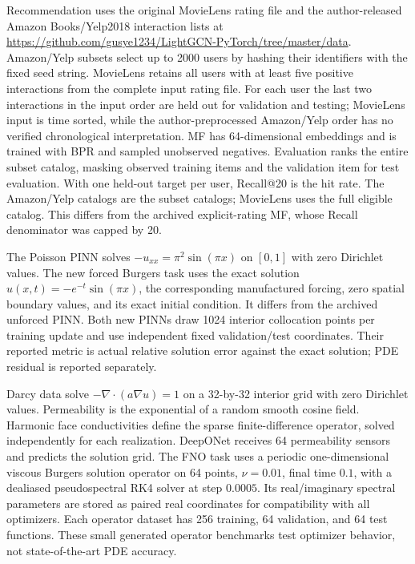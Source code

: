 Recommendation uses the original MovieLens rating file and the author-released
Amazon Books/Yelp2018 interaction lists at
\url{https://github.com/gusye1234/LightGCN-PyTorch/tree/master/data}.
Amazon/Yelp subsets select up to 2000 users by hashing their identifiers
with the fixed seed string. MovieLens retains all users with at least five
positive interactions from the complete input rating file. For each
user the last two interactions in the input order are held out for validation
and testing; MovieLens input is time sorted, while the author-preprocessed
Amazon/Yelp order has no verified chronological interpretation. MF has 64-dimensional
embeddings and is trained with BPR and sampled unobserved negatives. Evaluation
ranks the entire subset catalog, masking observed training items and the
validation item for test evaluation. With one held-out target per user,
Recall@20 is the hit rate. The Amazon/Yelp catalogs are the subset catalogs;
MovieLens uses the full eligible catalog. This differs from the archived
explicit-rating MF, whose Recall denominator was capped by 20.

The Poisson PINN solves $-u_{xx}=\pi^2\sin(\pi x)$ on $[0,1]$ with zero
Dirichlet values. The new forced Burgers task uses the exact solution
$u(x,t)=-e^{-t}\sin(\pi x)$, the corresponding manufactured forcing, zero
spatial boundary values, and its exact initial condition. It differs from the
archived unforced PINN. Both new PINNs draw 1024 interior collocation points
per training update and use independent fixed validation/test coordinates.
Their reported metric is actual relative solution error against the exact
solution; PDE residual is reported separately.

Darcy data solve $-\nabla\cdot(a\nabla u)=1$ on a 32-by-32 interior grid
with zero Dirichlet values. Permeability is the exponential of a random smooth
cosine field. Harmonic face conductivities define the sparse finite-difference
operator, solved independently for each realization. DeepONet receives 64
permeability sensors and predicts the solution grid. The FNO task uses a
periodic one-dimensional viscous Burgers solution operator on 64 points,
$\nu=0.01$, final time $0.1$, with a dealiased pseudospectral RK4 solver at
step $0.0005$. Its real/imaginary spectral parameters are stored as paired
real coordinates for compatibility with all optimizers. Each operator dataset
has 256 training, 64 validation, and 64 test functions. These small generated
operator benchmarks test optimizer behavior, not state-of-the-art PDE
accuracy.

